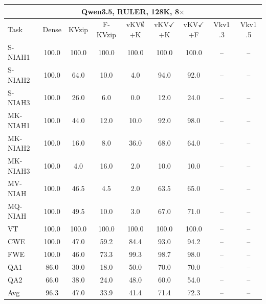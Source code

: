 \begin{tabular}{lcccccccc}
\toprule
\multicolumn{9}{c}{Qwen3.5, RULER, 128K, 8$\times$} \\
\midrule
Task & Dense & KVzip & F-KVzip & vKV$\emptyset$+K & vKV$\checkmark$+K & vKV$\checkmark$+F & Vkv1 .3 & Vkv1 .5 \\
\midrule
S-NIAH1 & 100.0 & 100.0 & 100.0 & 100.0 & 100.0 & 100.0 & -- & -- \\
S-NIAH2 & 100.0 & 64.0 & 10.0 & 4.0 & 94.0 & 92.0 & -- & -- \\
S-NIAH3 & 100.0 & 26.0 & 6.0 & 0.0 & 12.0 & 24.0 & -- & -- \\
MK-NIAH1 & 100.0 & 44.0 & 12.0 & 10.0 & 92.0 & 98.0 & -- & -- \\
MK-NIAH2 & 100.0 & 16.0 & 8.0 & 36.0 & 68.0 & 64.0 & -- & -- \\
MK-NIAH3 & 100.0 & 4.0 & 16.0 & 2.0 & 10.0 & 10.0 & -- & -- \\
MV-NIAH & 100.0 & 46.5 & 4.5 & 2.0 & 63.5 & 65.0 & -- & -- \\
MQ-NIAH & 100.0 & 49.5 & 10.0 & 3.0 & 67.0 & 71.0 & -- & -- \\
VT & 100.0 & 100.0 & 100.0 & 100.0 & 100.0 & 100.0 & -- & -- \\
CWE & 100.0 & 47.0 & 59.2 & 84.4 & 93.0 & 94.2 & -- & -- \\
FWE & 100.0 & 46.0 & 73.3 & 99.3 & 98.7 & 98.0 & -- & -- \\
QA1 & 86.0 & 30.0 & 18.0 & 50.0 & 70.0 & 70.0 & -- & -- \\
QA2 & 66.0 & 38.0 & 24.0 & 48.0 & 60.0 & 54.0 & -- & -- \\
\midrule
Avg & 96.3 & 47.0 & 33.9 & 41.4 & 71.4 & 72.3 & -- & -- \\
\bottomrule
\end{tabular}
\vspace{0.8em}

